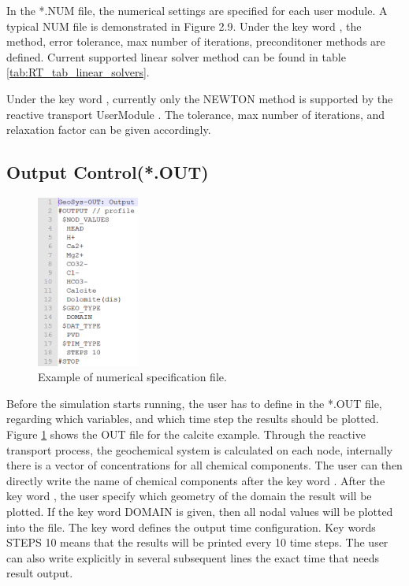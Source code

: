 In the *.NUM file, the numerical settings are specified for each user module. A typical NUM file is demonstrated in Figure 2.9. Under the key word , the method, error tolerance, max number of iterations, preconditoner methods are defined. Current supported linear solver method can be found in table \ref{tab:RT_tab_linear_solvers}. 

Under the key word , currently only the NEWTON method is supported by the reactive transport UserModule .  The tolerance, max number of iterations, and relaxation factor can be given accordingly. 


\subsection{Output Control(*.OUT)}

\begin{figure}
\includegraphics[width=0.3\textwidth]{RT/figs/RT_fig_out_file}
\caption{Example of numerical specification file. }
\label{fig:RT_fig_out_file}
\end{figure}

Before the simulation starts running, the user has to define in the *.OUT file, regarding which variables, and which time step the results should be plotted. Figure \ref{fig:RT_fig_out_file} shows the OUT file for the calcite example. Through the reactive transport process, the geochemical system is calculated on each node, internally there is a vector of concentrations for all chemical components. The user can then directly write the name of chemical components after the key word . After the key word , the user specify which geometry of the domain the result will be plotted. If the key word DOMAIN is given, then all nodal values will be plotted into the file. The key word  defines the output time configuration. Key words STEPS 10 means that the results will be printed every 10 time steps. The user can also write explicitly in several subsequent lines the exact time that needs result output.   

